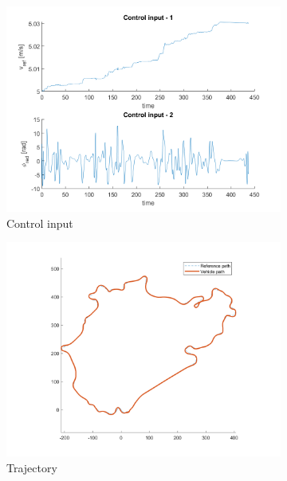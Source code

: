 \begin{figure}[H]
    \centering
     \begin{subfigure}[b]{0.45\textwidth}
         \centering
         \includegraphics[width=\textwidth]{Latex report/image/ex2/inputNewpole.png}
         \caption{Control input}
         \label{fig:NPinput}
     \end{subfigure}
     \begin{subfigure}[b]{0.45\textwidth}
         \centering
         \includegraphics[width=\textwidth]{Latex report/image/ex2/trajectoryNewpole.png}
         \caption{Trajectory}
         \label{fig:NPtraj}
     \end{subfigure}
     \begin{subfigure}[b]{0.8\textwidth}

\end{subfigure}
\end{figure}
